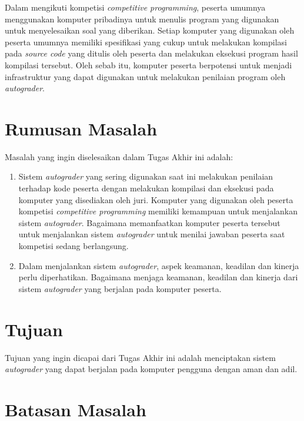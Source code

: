 \par Dalam mengikuti kompetisi \textit{competitive programming}, peserta umumnya menggunakan komputer pribadinya untuk menulis program yang digunakan untuk menyelesaikan soal yang diberikan. Setiap komputer yang digunakan oleh peserta umumnya memiliki spesifikasi yang cukup untuk melakukan kompilasi pada \textit{source code} yang ditulis oleh peserta dan melakukan eksekusi program hasil kompilasi tersebut. Oleh sebab itu, komputer peserta berpotensi untuk menjadi infrastruktur yang dapat digunakan untuk melakukan penilaian program oleh \textit{autograder}.

\section{Rumusan Masalah}

\par Masalah yang ingin diselesaikan dalam Tugas Akhir ini adalah:
\begin{enumerate}

	\item Sistem \textit{autograder} yang sering digunakan saat ini melakukan penilaian terhadap kode peserta dengan melakukan kompilasi dan eksekusi pada komputer yang disediakan oleh juri. Komputer yang digunakan oleh peserta kompetisi \textit{competitive programming} memiliki kemampuan untuk menjalankan sistem \textit{autograder}. Bagaimana memanfaatkan komputer peserta tersebut untuk menjalankan sistem \textit{autograder} untuk menilai jawaban peserta saat kompetisi sedang berlangsung.
	
	\item Dalam menjalankan sistem \textit{autograder}, aspek keamanan, keadilan dan kinerja perlu diperhatikan. Bagaimana menjaga keamanan, keadilan dan kinerja dari sistem \textit{autograder} yang berjalan pada komputer peserta.

\end{enumerate}

\section{Tujuan}

\par Tujuan yang ingin dicapai dari Tugas Akhir ini adalah menciptakan sistem \textit{autograder} yang dapat berjalan pada komputer pengguna dengan aman dan adil.

\section{Batasan Masalah}


